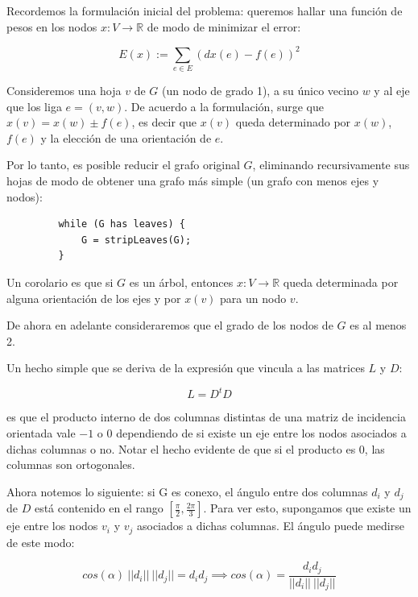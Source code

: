 \documentclass[10pt, a4paper, twocolumn]{article} %
\begin{document}
Recordemos la formulación inicial del problema: queremos hallar una 
función de pesos en los nodos $x: V \rightarrow \mathbb{R}$ de modo de 
minimizar el error:

$$E(x) := \sum_{e \in E} (dx(e) - f(e))^2$$

Consideremos una hoja $v$ de $G$ (un nodo de grado 1), a su único 
vecino $w$ y al eje que los liga $e=(v,w)$. De acuerdo a la formulación, 
surge que $x(v) = x(w) \pm f(e)$, es decir que $x(v)$ queda 
determinado por $x(w)$, $f(e)$ y la elección de una orientación de $e$.

\smallskip

Por lo tanto, es posible reducir el grafo original $G$, eliminando 
recursivamente sus  hojas de modo de obtener una grafo más simple (un 
grafo con menos ejes y nodos):

\begin{verbatim}
         while (G has leaves) {
             G = stripLeaves(G);
         }
\end{verbatim}

Un corolario es que si $G$ es un árbol, entonces $x: V 
\rightarrow \mathbb{R}$ queda determinada por alguna orientación de 
los ejes y por $x(v)$ para un nodo $v$.

\smallskip

De ahora en adelante consideraremos que el grado de los nodos de $G$ es 
al menos 2.
 
\bigskip


Un hecho simple que se deriva de la expresión que vincula a las matrices 
$L$ y $D$:

$$L = D^t D$$

es que el producto interno de dos columnas distintas de una matriz de 
incidencia orientada vale $-1$ o $0$ dependiendo de si existe un eje 
entre los nodos asociados a dichas columnas o no. Notar el hecho 
evidente de que si el producto es $0$, las columnas son
 ortogonales.

\smallskip

Ahora notemos lo siguiente: si G es conexo, el ángulo entre dos 
columnas $d_i$ y $d_j$ de $D$ está contenido en el rango 
$[\frac{\pi}{2},\frac{2\pi}{3}]$. Para ver esto, supongamos que existe 
un eje entre los nodos $v_i$ y $v_j$ asociados a dichas columnas. 
El ángulo puede medirse de este modo:

$$cos(\alpha) \ ||d_i|| \ ||d_j||= d_i  d_j \implies cos(\alpha) = 
\frac{d_i d_j}{||d_i|| \ ||d_j||}$$
\end{document}
